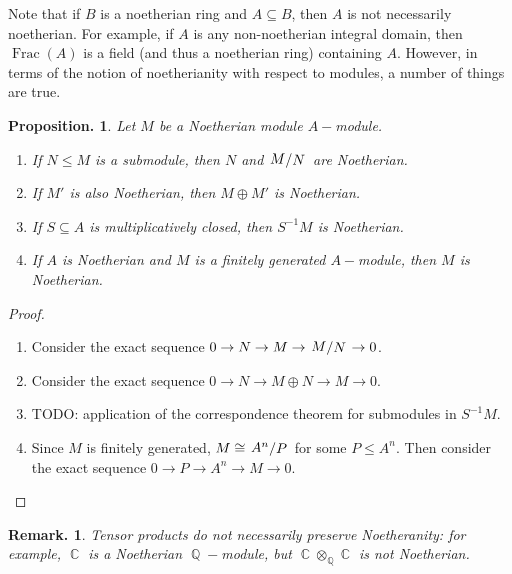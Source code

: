 \documentclass[11pt, a4paper]{memoir}
\DeclareMathOperator{\Q}{{\mathbb{Q}}}
\DeclareMathOperator{\C}{{\mathbb{C}}}
\theoremstyle{change}
\newtheorem{proposition}[theorem]{Proposition.}
\theoremstyle{plain}
\theoremstyle{nonumberplain}
\newtheorem{remark}{Remark.}
\newtheorem{proof}{Proof}
\DeclareMathOperator{\Frac}{Frac}
\newcommand{\quot}[2]{\mathchoice{\left.\raisebox{0.10em}{$#1$}\middle/\raisebox{-0.10em}{$#2$}\right.}
                                 {\left.\raisebox{0.04em}{$#1$}\middle/\raisebox{-0.04em}{$#2$}\right.}
                                 {\left.\raisebox{0.01em}{$#1$}\middle/\raisebox{-0.01em}{$#2$}\right.}
                                 {\left.\raisebox{0em}{$#1$}\middle/\raisebox{0em}{$#2$}\right.}}
\numberwithin{equation}{section}
\begin{document}
Note that if $B$ is a noetherian ring and $A\subseteq B$, then $A$ is not necessarily noetherian.
For example, if $A$ is any non-noetherian integral domain, then $\Frac(A)$ is a field (and thus a noetherian ring) containing $A$.
However, in terms of the notion of noetherianity with respect to modules, a number of things are true.
\begin{proposition}
    Let $M$ be a Noetherian module $A-$module.
    \begin{enumerate}[nl,r]
        \item If $N\leq M$ is a submodule, then $N$ and $\quot{M}{N}$ are Noetherian.
        \item If $M'$ is also Noetherian, then $M\oplus M'$ is Noetherian.
        \item If $S\subseteq A$ is multiplicatively closed, then $S^{-1}M$ is Noetherian.
        \item If $A$ is Noetherian and $M$ is a finitely generated $A-$module, then $M$ is Noetherian.
    \end{enumerate}
\end{proposition}
\begin{proof}
    \begin{enumerate}[r]
        \item Consider the exact sequence $0\to N\to M\to \quot{M}{N}\to 0$.
        \item Consider the exact sequence $0\to N\to M\oplus N\to M\to 0$.
        \item TODO: application of the correspondence theorem for submodules in $S^{-1}M$.
        \item Since $M$ is finitely generated, $M\cong \quot{A^n}{P}$ for some $P\leq A^n$.
            Then consider the exact sequence $0\to P\to A^n\to M\to 0$.
    \end{enumerate}
\end{proof}
\begin{remark}
    Tensor products do not necessarily preserve Noetheranity: for example, $\C$ is a Noetherian $\Q-$module, but $\C\otimes_{\Q}\C$ is not Noetherian.
\end{remark}
\end{document}
